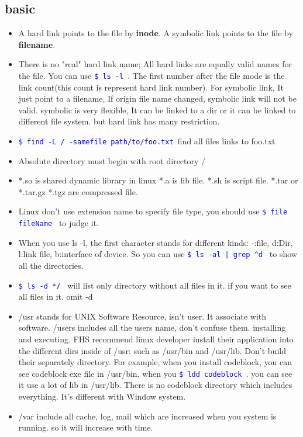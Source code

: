 \documentclass[a4paper,12pt,twoside]{book}
\newcommand{\linuxcommand}[1]{\texttt{\textcolor{blue}{\$ #1 \Pisymbol{psy}{191}}}}
\begin{document}
\subsection{basic}
\begin{itemize}
\item A hard link points to the file by \textbf{inode}.  A symbolic link points to the file by \textbf{filename}. 
 
\item  There is no "real" hard link name; All hard links are equally valid names for the file. You can use \linuxcommand{ls -l}. The first number after the file mode is the link count(this count is represent hard link number).  For symbolic link, It just point to a filename, If origin file name changed, symbolic link will not be valid.   symbolic is very flexible,  It can be linked to a dir or it can be linked to different file system. but hard link has many restriction. 

\item \linuxcommand{find -L / -samefile path/to/foo.txt}find all files links to foo.txt

\item Absolute directory must begin with root directory /
		
    \item *.so is shared dynamic library in linux *.a is lib file.  *.sh is script file. *.tar or *.tar.gz *.tgz are compressed file.

     \item Linux don't use extension name to specify file type, you should use \linuxcommand{file fileName} to judge it. 
     
	 \item When you use ls -l, the first character stands for different kinds: -:file, d:Dir,
         l:link file, b:interface of device. So you can use \linuxcommand{ls -al | grep \^{}d} to show all the directories. 
	 
    \item \linuxcommand{ls -d */} will list only directory without all files in it. if you want to see all files in it. omit -d
 
   \item /usr stands for UNIX Software Resource, isn't user. It associate with software. /users includes all the users name, don't confuse them. installing and executing. FHS recommend linux developer install their application into the different dirs inside of /usr:  such as /usr/bin and /usr/lib. Don't build their separately directory.  For example, when you install codeblock, you can see codeblock exe file in /usr/bin. when you \linuxcommand{ldd codeblock}. you can see it use a lot of lib in /usr/lib. There is no codeblock directory which includes everything.  It's different with Window system.
         \item /var include all cache, log, mail which are increased when you system is running. so it will increase with time. 
         

\end{itemize}
\end{document}
